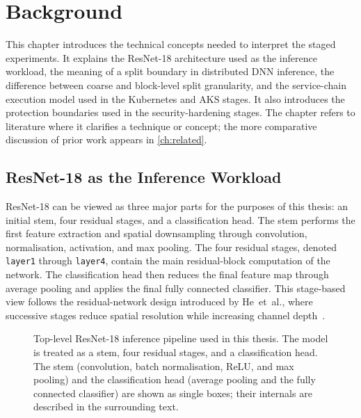 \chapter{Background}%
\label{ch:background}

This chapter introduces the technical concepts needed to interpret the staged
experiments. It explains the ResNet-18 architecture used as the inference workload,
the meaning of a split boundary in distributed DNN inference, the difference between
coarse and block-level split granularity, and the service-chain execution model used
in the Kubernetes and AKS stages. It also introduces the protection boundaries used in
the security-hardening stages. The chapter refers to literature where it clarifies a
technique or concept; the more comparative discussion of prior work appears in
\cref{ch:related}.

\section{ResNet-18 as the Inference Workload}
\label{sec:bg-resnet18}

ResNet-18 can be viewed as three major parts for the purposes of this thesis:
an initial stem, four residual stages, and a classification head. The stem performs
the first feature extraction and spatial downsampling through convolution,
normalisation, activation, and max pooling. The four residual stages, denoted
\texttt{layer1} through \texttt{layer4}, contain the main residual-block computation
of the network. The classification head then reduces the final feature map through
average pooling and applies the final fully connected classifier. This stage-based
view follows the residual-network design introduced by He~et~al., where successive
stages reduce spatial resolution while increasing channel depth~\cite{resnet}.

\begin{figure}[htbp]
\centering
%
\caption[Top-level ResNet-18 inference pipeline]{Top-level ResNet-18 inference pipeline used in this thesis. The model is treated as a stem, four residual stages, and a classification head. The stem (convolution, batch normalisation, ReLU, and max pooling) and the classification head (average pooling and the fully connected classifier) are shown as single boxes; their internals are described in the surrounding text.}
\label{fig:resnet18_pipeline}
\end{figure}

